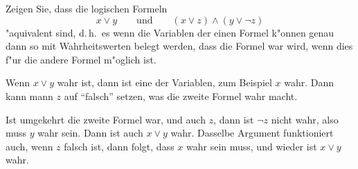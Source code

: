 Zeigen Sie, dass die logischen Formeln
\[
x\vee y\qquad\text{und}\qquad (x\vee z)\wedge (y\vee \neg z)
\]
"aquivalent sind, d.\,h.~es
wenn die Variablen der einen Formel k"onnen genau dann so mit Wahrheitswerten
belegt werden, dass die Formel war wird, wenn dies f"ur die andere Formel
m"oglich ist.

\begin{loesung}
Wenn $x\vee y$ wahr ist, dann ist eine der Variablen, zum Beispiel
$x$ wahr.
Dann kann mann $z$ auf ``falsch'' setzen, was die zweite Formel wahr macht.

Ist umgekehrt die zweite Formel war, und auch $z$, dann ist $\neg z$ nicht 
wahr, also muss $y$ wahr sein. Dann ist auch $x\vee y$ wahr. Dasselbe
Argument funktioniert auch, wenn $z$ falsch ist, dann folgt, dass $x$
wahr sein muss, und wieder ist $x\vee y$ wahr.
\end{loesung}
